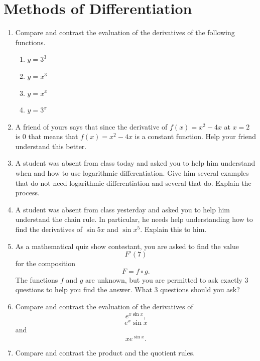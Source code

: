 \begin{enumerate}
 \end{enumerate}\section{Methods of Differentiation}\begin{enumerate}

\item  Compare and contrast the evaluation of the derivatives of the following functions.
\begin{enumerate}

\item  $y = 3^3$ 

\item   $y = x^3$ 

\item  $y = x^x$ 

\item   $y = 3^x$\end{enumerate}

\item  A friend of yours says that since the derivative of $f(x) = x^2 - 4x$ at $x = 2$ is 0 that means that $f(x) = x^2 - 4x$ is a constant function.  Help your friend understand this better.

\item  A student was absent from class today and asked you to help him understand when and how to use logarithmic differentiation.  Give him several examples that do not need logarithmic differentiation and several that do.  Explain the process.

\item  A student was absent from class yesterday and asked you to help him understand the chain rule.  In particular, he needs help understanding how to find the derivatives of $\sin 5 x$ and $\sin x^5$.  Explain this to him.

\item  As a mathematical quiz show contestant, you are asked to find the value $$F'\left( 7 \right)$$ for the composition $$F = f \circ g.$$  The functions $f$ and $g$ are unknown, but you are permitted to ask exactly 3 questions to help you find the answer.  What 3 questions should you ask?  \cite{EP}

\item  Compare and contrast the evaluation of the derivatives of $$e^{x\sin x} ,$$ $$e^x \sin x$$ and $$xe^{\sin x} .$$

\item  Compare and contrast the product and the quotient rules.


\end{enumerate}
